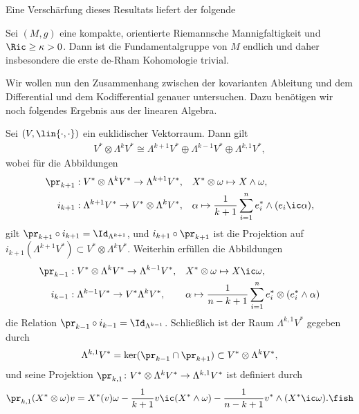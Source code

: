 \documentclass[%
	paper=a5,%
	fleqn,%
	DIV=18,%
	BCOR=0mm,
	fontsize=11pt,
	titlepage=false,%
	bibliography=totoc,
	DIV=18,%
	twoside=true,
	pdftitle=Riemannsche Geometrie,
	pdfauthor=Uwe Semmelmann,
	numbers=noendperiod]%
	{scrbook}
\begin{document}
Eine Verschärfung dieses Resultats liefert der folgende

\begin{prop}
Sei $(M,g)$ eine kompakte, orientierte Riemannsche Mannigfaltigkeit und $\Ric \ge \kappa > 0$. Dann ist die Fundamentalgruppe von $M$ endlich und daher insbesondere die erste de-Rham Kohomologie trivial.\fish
\end{prop}

Wir wollen nun den Zusammenhang zwischen der kovarianten Ableitung und dem Differential und dem Kodifferential genauer untersuchen. Dazu benötigen wir noch folgendes Ergebnis aus der linearen Algebra.

\begin{lem}
Sei $(V,\lin{\cdot,\cdot})$ ein euklidischer Vektorraum. Dann gilt
\begin{align*}
V^* \otimes \Lambda^k V^* \cong 
\Lambda^{k+1} V^*\oplus
\Lambda^{k-1} V^*\oplus
\Lambda^{k,1} V^*,
\end{align*}
wobei für die Abbildungen
\begin{align*}
\pr_{k+1} &: V^*\otimes \Lambda^k V^*\to \Lambda^{k+1}V^*, &&
X^*\otimes\omega\mapsto X\wedge\omega,\\
i_{k+1} &: \Lambda^{k+1}V^*\to V^*\otimes \Lambda^k V^*, && \alpha \mapsto
\frac{1}{k+1} \sum_{i=1}^n e_{i}^* \wedge (e_{i}\ic\alpha),
\end{align*}
gilt $\pr_{k+1}\circ i_{k+1}=\Id_{\Lambda^{k+1}}$, und $i_{k+1}\circ \pr_{k+1}$ ist die Projektion auf $i_{k+1}(\Lambda^{k+1}V^*) \subset V^*\otimes \Lambda^k V^*$. Weiterhin erfüllen die Abbildungen
\begin{align*}
\pr_{k-1} &: V^*\otimes \Lambda^k V^* \to \Lambda^{k-1}V^*,&& X^*\otimes \omega \mapsto X\ic \omega,\\
i_{k-1} &: \Lambda^{k-1}V^* \to V^*\Lambda^k V^*, &&
\alpha \mapsto \frac{1}{n-k+1} \sum_{i=1}^n e_{i}^* \otimes (e_{i}^*\wedge \alpha)
\end{align*}
die Relation $\pr_{k-1}\circ i_{k-1} = \Id_{\Lambda^{k-1}}$. Schließlich ist der Raum $\Lambda^{k,1}V^*$ gegeben durch
\begin{align*}
\Lambda^{k,1}V^* = \ker(\pr_{k-1}\cap \pr_{k+1}) \subset V^*\otimes \Lambda^k V^*,
\end{align*}
und seine Projektion $\pr_{k,1} \colon   V^*\otimes \Lambda^{k}V^* \to \Lambda^{k,1}V^*$ ist definiert durch
\begin{align*}
\pr_{k,1} (X^*\otimes \omega)v = 
X^*(v)\omega - \frac{1}{k+1}v\ic (X^*\wedge\omega) - \frac{1}{n-k+1} v^* \wedge(X^* \ic \omega).\fish
\end{align*}
\end{lem}
\end{document}

